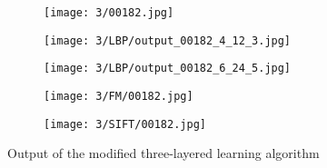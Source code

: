 \documentclass[draft,final]{vutinfth} %
\begin{document}
\begin{figure}[h]
  \centering
  \begin{subfigure}[t]{0.19\columnwidth}
    \centering
    \texttt{[image: 3/00182.jpg]}
    \label{fig:pe:182:orig}
  \end{subfigure}
  \begin{subfigure}[t]{0.19\columnwidth}
    \centering
    \texttt{[image: 3/LBP/output\_00182\_4\_12\_3.jpg]}
    \label{fig:pe:182:LBPs}
  \end{subfigure}
  \begin{subfigure}[t]{0.19\columnwidth}
    \centering
    \texttt{[image: 3/LBP/output\_00182\_6\_24\_5.jpg]}
    \label{fig:pe:182:LBPb}
  \end{subfigure}
  \begin{subfigure}[t]{0.19\columnwidth}
    \centering
    \texttt{[image: 3/FM/00182.jpg]}
    \label{fig:pe:182:FM}
  \end{subfigure}
  \begin{subfigure}[t]{0.19\columnwidth}
    \centering
    \texttt{[image: 3/SIFT/00182.jpg]}
    \label{fig:pe:182:SIFT}
  \end{subfigure}
  \caption{Output of the modified three-layered learning algorithm}
  \label{fig:pe:182}
\end{figure}
\end{document}
